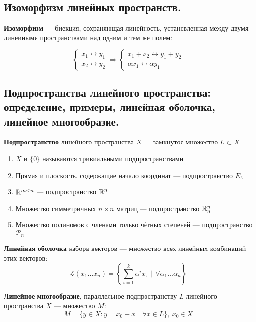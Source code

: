 \subsection{Изоморфизм линейных пространств.}
\begin{definition}
    \textbf{Изоморфизм} --- биекция, сохраняющая линейность, установленная между двумя линейными пространствами над одним и тем же полем:

    $$\begin{cases}
        x_1\leftrightarrow y_1 \\
        x_2\leftrightarrow y_2
    \end{cases} \Rightarrow \begin{cases}
        x_1+x_2\leftrightarrow y_1+y_2 \\
        \alpha x_1\leftrightarrow \alpha y_1
    \end{cases}$$
\end{definition}
\subsection{Подпространства линейного пространства: определение, примеры, линейная оболочка, линейное многообразие.}
\begin{definition}
    \textbf{Подпространство} линейного пространства $X$ --- замкнутое множество $L\subset X$
\end{definition}
\begin{example}
    \begin{enumerate}
        \item $X$ и $\{0\}$ называются тривиальными подпространствами
        \item Прямая и плоскость, содержащие начало координат --- подпространство $E_3$
        \item $\mathbb{R}^{m<n}$ --- подпространство $\mathbb{R}^n$
        \item Множество симметричных $n\times n$ матриц --- подпространство $\mathbb{R}^n_n$
        \item Множество полиномов с членами только чётных степеней --- подпространство $\mathcal{P}_n$
    \end{enumerate}
\end{example}
\begin{definition}
    \textbf{Линейная оболочка} набора векторов --- множество всех линейных комбинаций этих векторов: $$\mathcal{L}(x_1\ldots x_n)=\left\{\sum\limits_{i=1}^k \alpha^ix_i \ \ |\ \ \forall \alpha_1\ldots \alpha_n\right\}$$
\end{definition}
\begin{definition}
    \textbf{Линейное многообразие}, параллельное подпространству $L$ линейного пространства $X$ --- множество $M$: $$M=\{y\in X : y=x_0+x \quad \forall x\in L\},\ x_0\in X$$
\end{definition}
